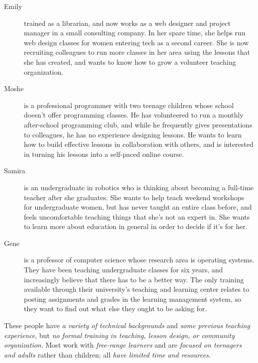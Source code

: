 \begin{description}

  \item[Emily] trained as a librarian, and now works as a web designer
    and project manager in a small consulting company.  In her spare
    time, she helps run web design classes for women entering tech as
    a second career.  She is now recruiting colleagues to run more
    classes in her area using the lessons that she has created, and
    wants to know how to grow a volunteer teaching organization.

  \item[Moshe] is a professional programmer with two teenage children
    whose school doesn't offer programming classes.  He has
    volunteered to run a monthly after-school programming club, and
    while he frequently gives presentations to colleagues, he has no
    experience designing lessons.  He wants to learn how to build
    effective lessons in collaboration with others, and is interested
    in turning his lessons into a self-paced online course.

  \item[Samira] is an undergraduate in robotics who is thinking about
    becoming a full-time teacher after she graduates.  She wants to
    help teach weekend workshops for undergraduate women, but has
    never taught an entire class before, and feels uncomfortable
    teaching things that she's not an expert in.  She wants to learn
    more about education in general in order to decide if it's for
    her.

  \item[Gene] is a professor of computer science whose research area
    is operating systems.  They have been teaching undergraduate
    classes for six years, and increasingly believe that there has to
    be a better way. The only training available through their
    university's teaching and learning center relates to posting
    assignments and grades in the learning management system, so they
    want to find out what else they ought to be asking for.

\end{description}

\noindent
These people have \emph{a variety of technical backgrounds} and
\emph{some previous teaching experience}, but \emph{no formal training
  in teaching, lesson design, or community organization}.  Most work
with \emph{free-range learners} and are \emph{focused on teenagers and
  adults} rather than children; all \emph{have limited time and
  resources}.

